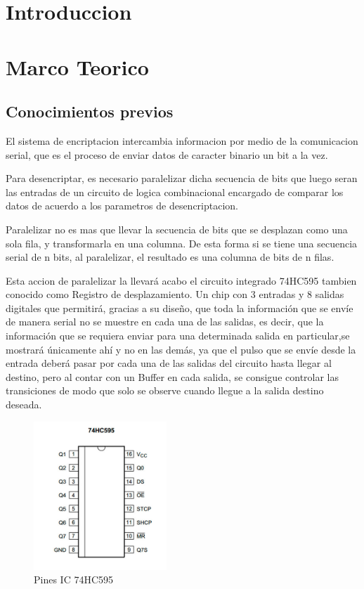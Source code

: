 \documentclass{article}
\begin{document}
\section{Introduccion}\label{intro}
\section{Marco Teorico}\label{marco}

\subsection{Conocimientos previos}

El sistema de encriptacion intercambia informacion por medio de la comunicacion serial, que es el proceso de enviar datos de caracter binario un bit a la vez.

Para desencriptar, es necesario paralelizar dicha secuencia de bits que luego seran las entradas de un circuito de logica combinacional encargado de comparar los datos de acuerdo a los parametros de desencriptacion.

Paralelizar no es mas que llevar la secuencia de bits que se desplazan como una sola fila, y transformarla en una columna. De esta forma si se tiene una secuencia serial de n bits, al paralelizar, el resultado es una columna de bits de n filas.

Esta accion de paralelizar la llevará acabo el circuito integrado 74HC595 tambien conocido como Registro de desplazamiento. Un chip con 3 entradas y 8 salidas digitales que permitirá, gracias a su diseño, que toda la información que se envíe de manera serial no se muestre en cada una de las salidas, es decir, que la información que se requiera enviar para una determinada salida en particular,se mostrará únicamente ahí y no en las demás, ya que el pulso que se envíe desde la entrada deberá pasar por cada una de las salidas del circuito hasta llegar al destino, pero al contar con un Buffer en cada salida, se consigue controlar las transiciones de modo que solo se observe cuando llegue a la salida destino deseada.


\begin{figure}[!ht]
\includegraphics[width=5cm]{74HC595.jpg}
\centering
\caption{Pines IC 74HC595}
\end{figure}
\end{document}
